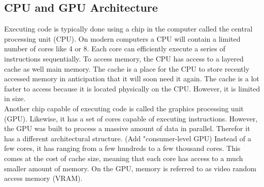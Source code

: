 \subsection{CPU and GPU Architecture}

Executing code is typically done using a chip in the computer called the central processing unit (CPU). On modern computers a CPU will contain a limited number of cores like 4 or 8. Each core can efficiently execute a series of instructions sequentially. To access memory, the CPU has access to a layered cache as well main memory. The cache is a place for the CPU to store recently accessed memory in anticipation that it will soon need it again. The cache is a lot faster to access because it is located physically on the CPU. However, it is limited in size. \\

Another chip capable of executing code is called the graphics processing unit (GPU). Likewise, it has a set of cores capable of executing instructions. However, the GPU was built to process a massive amount of data in parallel. Therefor it has a different architectural structure. (Add "consumer-level GPU) Instead of a few cores, it has ranging from a few hundreds to a few thousand cores. This comes at the cost of cache size, meaning that each core has access to a much smaller amount of memory. On the GPU, memory is referred to as video random access memory (VRAM). 


